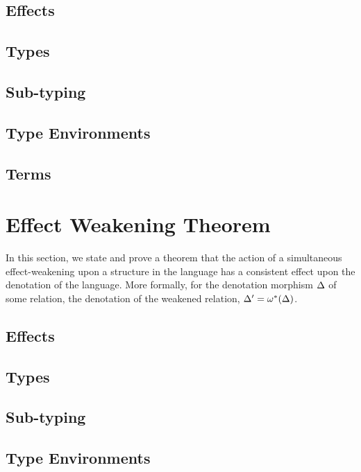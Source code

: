 \documentclass{report}
\begin{document}
\section{Effects}
\effectSubstitutionEffects


\section{Types}
\effectSubstitutionTypesSimple

\section{Sub-typing}

\section{Type Environments}
\effectSubstitutionTypeEnvsSimple

\section{Terms}
\effectSubstitutionTerms

\chapter{Effect Weakening Theorem}
In this section, we state and prove a theorem that the action of a simultaneous effect-weakening upon a structure in the language has a consistent effect upon the denotation of the language. More formally, for the denotation morphism $\Delta$ of some relation, the denotation of the weakened relation, $\Delta' = \omega^*(\Delta)$.

\section{Effects}
\effectWeakeningEffects

\section{Types}
\effectWeakeningTypesSimple

\section{Sub-typing}

\section{Type Environments}
\effectWeakeningTypeEnvSimple
\end{document}
